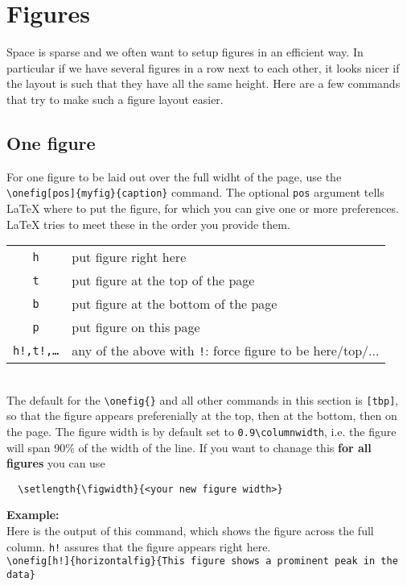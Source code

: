 \documentclass[a4paper,11pt]{article}
\begin{document}
\section{Figures}
Space is sparse and we often want to setup figures in an efficient way. In
particular if we have several figures in a row next to each other, it looks
nicer if the layout is such that they have all the same height. Here are a few
commands that try to make such a figure layout easier.

\subsection{One figure}
For one figure to be laid out over the full widht of the page, use the
\verb|\onefig[pos]{myfig}{caption}| command. The optional {\tt pos} argument
tells \LaTeX{} where to put the figure, for which you can give one or more
preferences. \LaTeX{} tries to meet these in the order you provide them.\\

\begin{tabular}{cl}
  {\tt h} & put figure right here \\
  {\tt t} & put figure at the top of the page \\
  {\tt b} & put figure at the bottom of the page \\
  {\tt p} & put figure on this page \\
  {\tt h!,t!,\ldots} & any of the above with {\tt !}: force figure to be
  here/top/... 
\end{tabular}\\

The default for the \verb|\onefig{}| and all other commands in this section is
\verb|[tbp]|, so that the figure appears preferenially at the top, then at the
bottom, then on the page. The figure width is by default set to \verb|0.9\columnwidth|, i.e. the figure will
span 90\% of the width of the line. If you want to chanage this {\bf for all
figures} you can use
\begin{verbatim}
  \setlength{\figwidth}{<your new figure width>}
\end{verbatim}

{\bf Example:}\\
Here is the output of this command, which shows the figure across the full
column. {\tt h!} assures that the figure appears right here.\\
\verb|\onefig[h!]{horizontalfig}{This figure shows a prominent peak in the data}|
\end{document}
